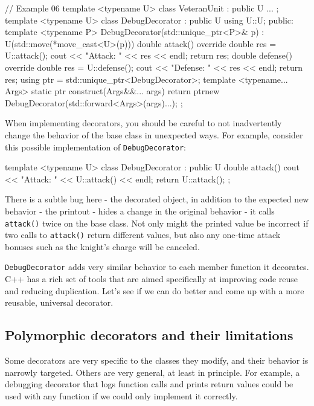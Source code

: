\begin{code}
// Example 06
template <typename U> class VeteranUnit : public U {
  ...
};
template <typename U> class DebugDecorator : public U {
  using U::U;
  public:
  template <typename P>
  DebugDecorator(std::unique_ptr<P>& p) :
    U(std::move(*move_cast<U>(p))) {}
  double attack() override {
    double res = U::attack();
    cout << "Attack: " << res << endl;
    return res;
  }
  double defense() override {
    double res = U::defense();
    cout << "Defense: " << res << endl;
    return res;
  }
  using ptr = std::unique_ptr<DebugDecorator>;
  template <typename... Args>
  static ptr construct(Args&&... args) { return
    ptr{new DebugDecorator(std::forward<Args>(args)...)};
  }
};
\end{code}

When implementing decorators, you should be careful to not inadvertently change the behavior of the base class in unexpected ways. For example, consider this possible implementation of \texttt{DebugDecorator}:

\begin{code}
template <typename U> class DebugDecorator : public U {
  double attack() {
    cout << "Attack: " << U::attack() << endl;
    return U::attack();
  }
};
\end{code}

There is a subtle bug here - the decorated object, in addition to the expected new behavior - the printout - hides a change in the original behavior - it calls \texttt{attack()} twice on the base class. Not only might the printed value be incorrect if two calls to \texttt{attack()} return different values, but also any one-time attack bonuses such as the knight's charge will be canceled.

\texttt{DebugDecorator} adds very similar behavior to each member function it decorates. C++ has a rich set of tools that are aimed specifically at improving code reuse and reducing duplication. Let's see if we can do better and come up with a more reusable, universal decorator.

\subsection{Polymorphic decorators and their limitations}

Some decorators are very specific to the classes they modify, and their behavior is narrowly targeted. Others are very general, at least in principle. For example, a debugging decorator that logs function calls and prints return values could be used with any function if we could only implement it correctly.

